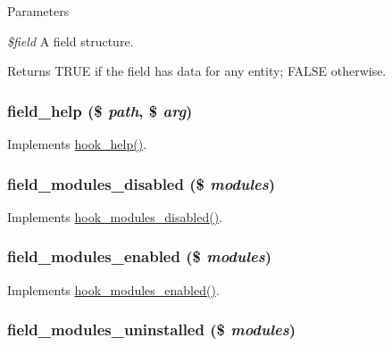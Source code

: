 \begin{DoxyParams}{Parameters}
\item[{\em \$field}]A field structure. \end{DoxyParams}
\begin{DoxyReturn}{Returns}
TRUE if the field has data for any entity; FALSE otherwise. 
\end{DoxyReturn}
\hypertarget{group__field_ga8a225102daf78db5ed14900af54e795a}{
\subsubsection[{field\_\-help}]{\setlength{\rightskip}{0pt plus 5cm}field\_\-help (\$ {\em path}, \/  \$ {\em arg})}}
\label{group__field_ga8a225102daf78db5ed14900af54e795a}
Implements \hyperlink{group__hooks_ga5589c2714a782738e8851c4c90231f0e}{hook\_\-help()}. \hypertarget{group__field_ga608c655389025a251db0881706d70d59}{
\subsubsection[{field\_\-modules\_\-disabled}]{\setlength{\rightskip}{0pt plus 5cm}field\_\-modules\_\-disabled (\$ {\em modules})}}
\label{group__field_ga608c655389025a251db0881706d70d59}
Implements \hyperlink{group__hooks_ga591c577fba8ca8dc8ec17f8bf80bdc4c}{hook\_\-modules\_\-disabled()}. \hypertarget{group__field_ga9cc8250f001fdb464340cbf7a0e548af}{
\subsubsection[{field\_\-modules\_\-enabled}]{\setlength{\rightskip}{0pt plus 5cm}field\_\-modules\_\-enabled (\$ {\em modules})}}
\label{group__field_ga9cc8250f001fdb464340cbf7a0e548af}
Implements \hyperlink{group__hooks_ga0eb7c67333e0f40b4a46c0dc4c4a92f3}{hook\_\-modules\_\-enabled()}. \hypertarget{group__field_gacc7e883a1a3d5103fe4284be28547450}{
\subsubsection[{field\_\-modules\_\-uninstalled}]{\setlength{\rightskip}{0pt plus 5cm}field\_\-modules\_\-uninstalled (\$ {\em modules})}}
